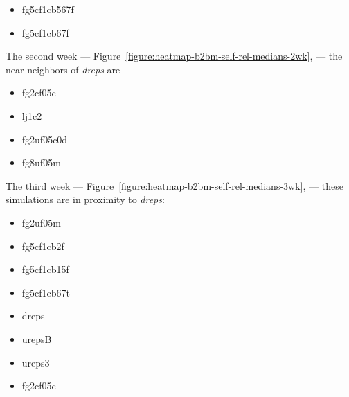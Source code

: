 \documentclass[10pt,oneside]{memoir}
\begin{document}
\begin{Spacing}{2}
\begin{itemize}
\item fg5cf1cb567f

\item fg5cf1cb67f
\end{itemize}

The second week --- Figure~\ref{figure:heatmap-b2bm-self-rel-medians-2wk}, --- the near neighbors of {\itshape dreps} are


\begin{itemize}


\item fg2cf05c

\item lj1c2

\item fg2uf05c0d

\item fg8uf05m
\end{itemize}

The third week --- Figure~\ref{figure:heatmap-b2bm-self-rel-medians-3wk}, --- these simulations are in proximity to {\itshape dreps}:


\begin{itemize}


\item fg2uf05m

\item fg5cf1cb2f

\item fg5cf1cb15f

\item fg5cf1cb67t

\item dreps

\item urepsB

\item ureps3

\item fg2cf05c
\end{itemize}



\end{Spacing}
\end{document}
